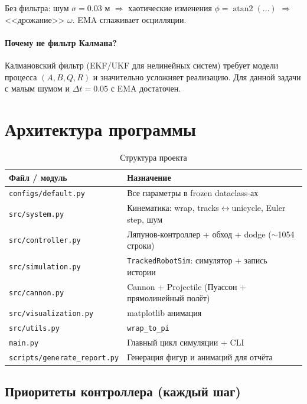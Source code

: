 \documentclass[12pt, a4paper]{article}
\newcommand{\atantwo}{\operatorname{atan2}}
\theoremstyle{definition}
\theoremstyle{plain}
\begin{document}
Без фильтра: шум $\sigma = 0.03$ м $\Rightarrow$ хаотические изменения
$\phi = \atantwo(\ldots)$ $\Rightarrow$ <<дрожание>> $\omega$.  EMA сглаживает
осцилляции.

\paragraph{Почему не фильтр Калмана?}  Калмановский фильтр (EKF/UKF для
нелинейных систем) требует модели процесса $(A, B, Q, R)$ и значительно
усложняет реализацию.  Для данной задачи с малым шумом и $\Delta t = 0.05$ с
EMA достаточен.

\section{Архитектура программы}\label{sec:architecture}

\begin{table}[H]
\centering
\caption{Структура проекта}
\begin{tabular}{@{}ll@{}}
\toprule
Файл / модуль & Назначение \\
\midrule
\texttt{configs/default.py}   & Все параметры в frozen dataclass-ах \\
\texttt{src/system.py}        & Кинематика: wrap, tracks$\leftrightarrow$unicycle, Euler step, шум \\
\texttt{src/controller.py}    & Ляпунов-контроллер + обход + dodge ($\sim$1054 строки) \\
\texttt{src/simulation.py}    & \texttt{TrackedRobotSim}: симулятор + запись истории \\
\texttt{src/cannon.py}        & Cannon + Projectile (Пуассон + прямолинейный полёт) \\
\texttt{src/visualization.py} & matplotlib анимация \\
\texttt{src/utils.py}         & \texttt{wrap\_to\_pi} \\
\texttt{main.py}              & Главный цикл симуляции + CLI \\
\texttt{scripts/generate\_report.py} & Генерация фигур и анимаций для отчёта \\
\bottomrule
\end{tabular}
\end{table}

\subsection{Приоритеты контроллера (каждый шаг)}
\end{document}

